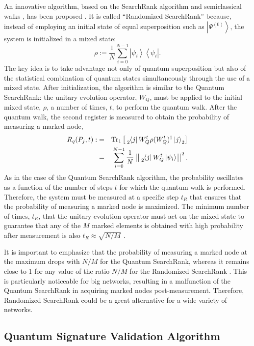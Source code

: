 \documentclass[nofootinbib,aps,prd,reprint,superscriptaddress,floatfix]{revtex4-2}
\begin{document}
An innovative algorithm, based on the SearchRank algorithm and semiclassical walks \cite{Semiclassical}, has been proposed \cite{Randomized}. It is called ``Randomized SearchRank'' because, instead of employing an initial state of equal superposition such as $\left|\Psi^{(0)}\right>$, the system is initialized in a mixed state:
\begin{equation}\label{rho}
	\rho := \frac{1}{N} \sum_{i=0}^{N-1} \left|\psi_i\right>\left<\psi_i\right|.
\end{equation}
The key idea is to take advantage not only of quantum superposition but also of the statistical combination of quantum states simultaneously through the use of a mixed state. After initialization, the algorithm is similar to the Quantum SearchRank: the unitary evolution operator, $W_Q$, must be applied to the initial mixed state, $\rho$, a number of times, $t$, to perform the quantum walk. After the quantum walk, the second register is measured to obtain the probability of measuring a marked node,
\begin{eqnarray}\label{trace_1}
R_q(P_j,t) :&=& \text{Tr}_1 \left[\tensor[_2]{\left<j\right|W_Q^{t} \rho (W_Q^{t})^\dagger\left|j\right>}{_2}\right]\nonumber\\
&=&\sum_{i=0}^{N-1}\frac{1}{N}\left|\left|\tensor[_2]{\left<j\right|W_Q^{t}\left|\psi_i\right>}{}\right|\right|^2.
\end{eqnarray}
As in the case of the Quantum SearchRank algorithm, the probability oscillates as a function of the number of steps $t$ for which the quantum walk is performed. Therefore, the system must be measured at a specific step $t_R$ that ensures that the probability of measuring a marked node is maximized. The minimum number of times, $t_R$, that the unitary evolution operator must act on the mixed state to guarantee that any of the $M$ marked elements is obtained with high probability after measurement is also $t_R \approx \sqrt{N/M}$ \cite{Randomized}. 

It is important to emphasize that the probability of measuring a marked node at the maximum drops with $N/M$ for the Quantum SearchRank, whereas it remains close to 1 for any value of the ratio $N/M$ for the Randomized SearchRank \cite{Randomized}. This is particularly noticeable for big networks, resulting in a malfunction of the Quantum SearchRank in acquiring marked nodes post-measurement. Therefore, Randomized SearchRank could be a great alternative for a wide variety of networks.

\subsection{Quantum Signature Validation Algorithm}\label{subsec:QSVA}
\end{document}
